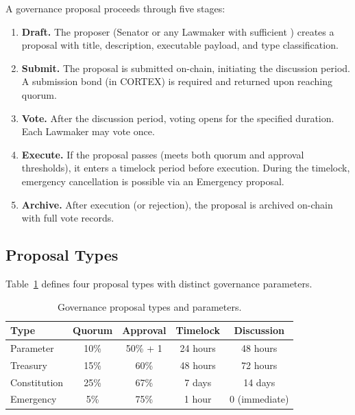 A governance proposal proceeds through five stages:

\begin{enumerate}
  \item \textbf{Draft.} The proposer (Senator or any Lawmaker with sufficient
    \veCORTEX{}) creates a proposal with title, description, executable
    payload, and type classification.
  \item \textbf{Submit.} The proposal is submitted on-chain, initiating the
    discussion period. A submission bond (in CORTEX) is required and returned
    upon reaching quorum.
  \item \textbf{Vote.} After the discussion period, voting opens for the
    specified duration. Each Lawmaker may vote once.
  \item \textbf{Execute.} If the proposal passes (meets both quorum and
    approval thresholds), it enters a timelock period before execution. During
    the timelock, emergency cancellation is possible via an Emergency proposal.
  \item \textbf{Archive.} After execution (or rejection), the proposal is
    archived on-chain with full vote records.
\end{enumerate}

\subsection{Proposal Types}
\label{subsec:proposal-types}

Table~\ref{tab:proposal-types} defines four proposal types with distinct
governance parameters.

\begin{table}[H]
\centering
\caption{Governance proposal types and parameters.}
\label{tab:proposal-types}
\begin{tabular}{@{}lcccc@{}}
\toprule
\textbf{Type} & \textbf{Quorum} & \textbf{Approval} & \textbf{Timelock} & \textbf{Discussion} \\
\midrule
Parameter & 10\% & 50\% + 1 & 24 hours & 48 hours \\
Treasury & 15\% & 60\% & 48 hours & 72 hours \\
Constitution & 25\% & 67\% & 7 days & 14 days \\
Emergency & 5\% & 75\% & 1 hour & 0 (immediate) \\
\bottomrule
\end{tabular}
\end{table}

